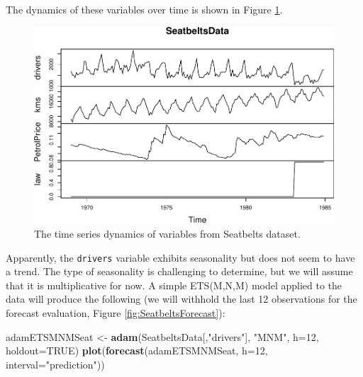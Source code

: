 \documentclass[]{book}
\newenvironment{Shaded}{\begin{snugshade}}{\end{snugshade}}
\newcommand{\DataTypeTok}[1]{\textcolor[rgb]{0.13,0.29,0.53}{#1}}
\newcommand{\DecValTok}[1]{\textcolor[rgb]{0.00,0.00,0.81}{#1}}
\newcommand{\KeywordTok}[1]{\textcolor[rgb]{0.13,0.29,0.53}{\textbf{#1}}}
\newcommand{\NormalTok}[1]{#1}
\newcommand{\OtherTok}[1]{\textcolor[rgb]{0.56,0.35,0.01}{#1}}
\newcommand{\StringTok}[1]{\textcolor[rgb]{0.31,0.60,0.02}{#1}}
\theoremstyle{definition}
\theoremstyle{definition}
\theoremstyle{definition}
\theoremstyle{definition}
\theoremstyle{remark}
\begin{document}
The dynamics of these variables over time is shown in Figure \ref{fig:Seatbelts}.

\begin{figure}
\centering
\includegraphics{Svetunkov--2022----ADAM_files/figure-latex/Seatbelts-1.pdf}
\caption{\label{fig:Seatbelts}The time series dynamics of variables from Seatbelts dataset.}
\end{figure}

Apparently, the \texttt{drivers} variable exhibits seasonality but does not seem to have a trend. The type of seasonality is challenging to determine, but we will assume that it is multiplicative for now. A simple ETS(M,N,M) model applied to the data will produce the following (we will withhold the last 12 observations for the forecast evaluation, Figure \ref{fig:SeatbeltsForecast}):

\begin{Shaded}
\begin{Highlighting}[]
\NormalTok{adamETSMNMSeat <-}\StringTok{ }\KeywordTok{adam}\NormalTok{(SeatbeltsData[,}\StringTok{"drivers"}\NormalTok{], }\StringTok{"MNM"}\NormalTok{,}
                       \DataTypeTok{h=}\DecValTok{12}\NormalTok{, }\DataTypeTok{holdout=}\OtherTok{TRUE}\NormalTok{)}
\KeywordTok{plot}\NormalTok{(}\KeywordTok{forecast}\NormalTok{(adamETSMNMSeat, }\DataTypeTok{h=}\DecValTok{12}\NormalTok{, }\DataTypeTok{interval=}\StringTok{"prediction"}\NormalTok{))}
\end{Highlighting}
\end{Shaded}
\end{document}
